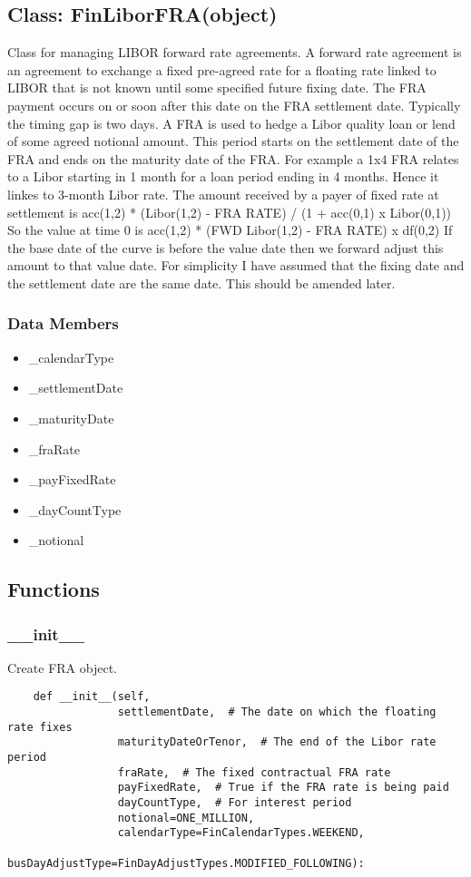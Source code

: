 \documentclass[twoside,11pt]{book}
\begin{document}
\subsection*{Class: FinLiborFRA(object)}
Class for managing LIBOR forward rate agreements. A forward rate agreement is an agreement to exchange a fixed pre-agreed rate for a floating rate linked to LIBOR that is not known until some specified future fixing date. The FRA payment occurs on or soon after this date on the FRA settlement date. Typically the timing gap is two days.  A FRA is used to hedge a Libor quality loan or lend of some agreed notional amount. This period starts on the settlement date of the FRA and ends on the maturity date of the FRA. For example a 1x4 FRA relates to a Libor starting in 1 month for a loan period ending in 4 months. Hence it linkes to 3-month Libor rate.  The amount received by a payer of fixed rate at settlement is  acc(1,2) * (Libor(1,2) - FRA RATE) / (1 + acc(0,1) x Libor(0,1))  So the value at time 0 is  acc(1,2) * (FWD Libor(1,2) - FRA RATE) x df(0,2)  If the base date of the curve is before the value date then we forward adjust this amount to that value date.  For simplicity I have assumed that the fixing date and the settlement date are the same date. This should be amended later.  

\subsubsection*{Data Members}
\begin{itemize}
\item{\_calendarType}
\item{\_settlementDate}
\item{\_maturityDate}
\item{\_fraRate}
\item{\_payFixedRate}
\item{\_dayCountType}
\item{\_notional}
\end{itemize}

\subsection*{Functions}

\subsubsection*{{\bf \_\_init\_\_}}
Create FRA object.  

\begin{lstlisting}
    def __init__(self,
                 settlementDate,  # The date on which the floating rate fixes
                 maturityDateOrTenor,  # The end of the Libor rate period
                 fraRate,  # The fixed contractual FRA rate
                 payFixedRate,  # True if the FRA rate is being paid
                 dayCountType,  # For interest period
                 notional=ONE_MILLION,
                 calendarType=FinCalendarTypes.WEEKEND,
                 busDayAdjustType=FinDayAdjustTypes.MODIFIED_FOLLOWING):
\end{lstlisting}
\end{document}
